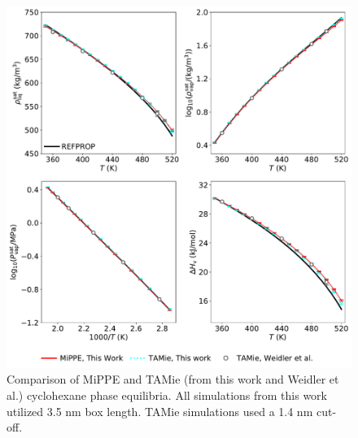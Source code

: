 \documentclass[journal=jctc,manuscript=article]{achemso}
\begin{document}
\begin{figure}[H]
	\centering
	\includegraphics[width=5.8in]{CYC6_VLE_MiPPE_TAMie.pdf}
	\caption{Comparison of MiPPE and TAMie (from this work and Weidler et al.) cyclohexane phase equilibria. All simulations from this work utilized 3.5 nm box length. TAMie simulations used a 1.4 nm cut-off.}
	\label{SI fig: CYC6_VLE_MiPPE_TAMie}
\end{figure}
\end{document}
